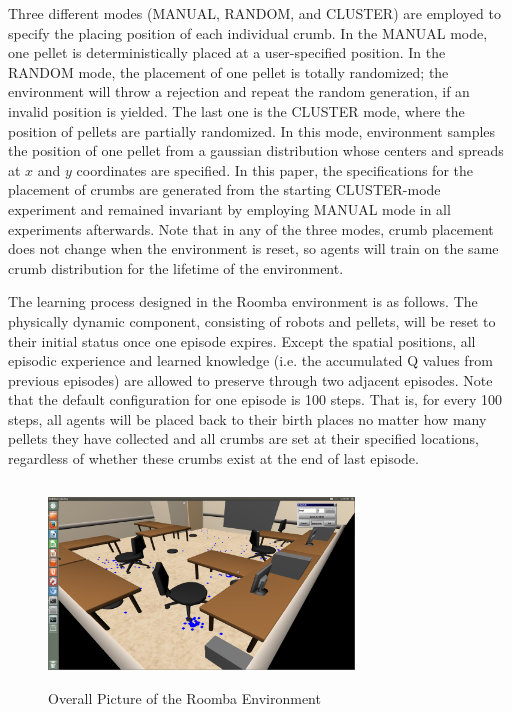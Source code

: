 \documentclass[conference]{IEEEtran}
\begin{document}
Three different modes (MANUAL, RANDOM, and CLUSTER) are employed to specify
the placing position of each individual crumb.
In the MANUAL mode, one pellet is deterministically placed at a user-specified
position. 
In the RANDOM mode, the placement of one pellet is totally randomized; the
environment will throw a rejection and repeat the random generation, if an
invalid position is yielded. The last one is the CLUSTER mode, where the
position of pellets are partially randomized. In this mode,
environment samples the position of one pellet from a gaussian distribution
whose centers and spreads at $x$ and $y$ coordinates are specified. 
In this paper, the specifications for the placement of crumbs are generated
from the starting CLUSTER-mode experiment and remained invariant by
employing MANUAL mode in all experiments afterwards.
Note that in any of the three modes, crumb placement does not change when the environment is reset, so agents will train on the same crumb distribution for the lifetime of the environment.

The learning process designed in the Roomba environment is as follows. 
The physically dynamic component, consisting of robots and pellets, will be
reset to their initial status once one episode expires. 
Except the spatial positions, all episodic experience and learned knowledge
(i.e. the accumulated Q values from previous episodes) are allowed to preserve
through two adjacent episodes.  
Note that the default configuration for one episode is 100 steps. That is,
for every 100 steps, all agents will be placed back to their birth places no
matter how many pellets they have collected and all crumbs are set at
their specified locations, regardless of whether these crumbs exist at the end
of last episode. 

\begin{figure}[!t]
\centering
\includegraphics[width=3.2in,height=2.1in]{./figures/roombas/roomba2.png}
\caption{Overall Picture of the Roomba Environment}
\label{roomba:world}
\end{figure}
\end{document}
